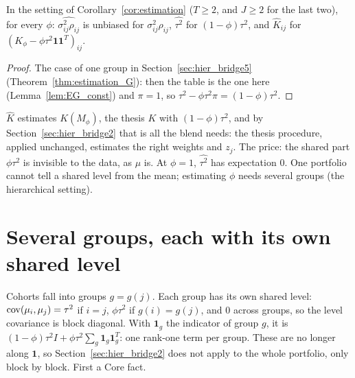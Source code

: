 \begin{corollary}\label{cor:estimation_phi}
  \leanok
  In the setting of Corollary~\ref{cor:estimation} ($T \ge 2$, and $J \ge 2$
  for the last two), for every $\phi$: $\widehat{\sigma^2_{ij}\rho_{ij}}$ is
  unbiased for $\sigma^2_{ij}\rho_{ij}$, $\widehat{\tau^2}$ for $(1-\phi)\tau^2$,
  and $\hat K_{ij}$ for $(K_\phi - \phi\tau^2\mathbf 1\mathbf 1^T)_{ij}$.
\end{corollary}
\begin{proof}
  \leanok
  The case of one group in Section~\ref{sec:hier_bridge5}
  (Theorem~\ref{thm:estimation_G}): then the table is the one here
  (Lemma~\ref{lem:EG_const}) and $\pi = 1$, so $\tau^2 - \phi\tau^2\pi = (1-\phi)\tau^2$.
\end{proof}

\begin{remark}\label{rem:hier_bridge3}
  $\hat K$ estimates $K(M_\phi)$, the thesis $K$ with $(1-\phi)\tau^2$, and by
  Section~\ref{sec:hier_bridge2} that is all the blend needs: the thesis
  procedure, applied unchanged, estimates the right weights and $z_j$. The
  price: the shared part $\phi\tau^2$ is invisible to the data, as $\mu$ is.
  At $\phi = 1$, $\widehat{\tau^2}$ has expectation $0$. One portfolio cannot
  tell a shared level from the mean; estimating $\phi$ needs several groups
  (the hierarchical setting).
\end{remark}

\section{Several groups, each with its own shared level}\label{sec:hier_bridge4}

Cohorts fall into groups $g = g(j)$. Each group has its own shared level:
$\operatorname{cov}(\mu_i,\mu_j) = \tau^2$ if $i = j$, $\phi\tau^2$ if $g(i) = g(j)$, and $0$
across groups, so the level covariance is block diagonal. With
$\mathbf 1_g$ the indicator of group $g$, it is
$(1-\phi)\tau^2 I + \phi\tau^2\sum_g \mathbf 1_g\mathbf 1_g^T$: one rank-one term
per group. These are no longer along $\mathbf 1$, so Section~\ref{sec:hier_bridge2}
does not apply to the whole portfolio, only block by block. First a Core fact.

